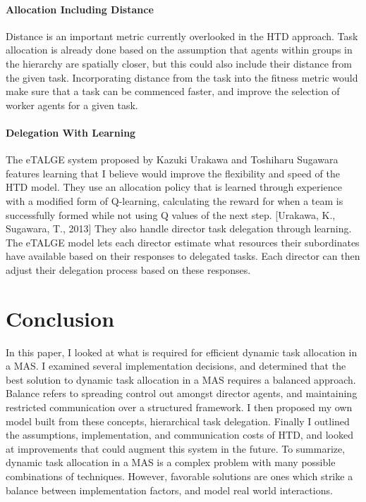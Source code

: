 \documentclass[12pt,letterpaper,onecolumn]{article}
\begin{document}
	\paragraph{Allocation Including Distance}
	Distance is an important metric currently overlooked in the HTD approach. Task allocation is already done based on the assumption that agents within groups in the hierarchy are spatially closer, but this could also include their distance from the given task. Incorporating distance from the task into the fitness metric would make sure that a task can be commenced faster, and improve the selection of worker agents for a given task.
	\paragraph{Delegation With Learning}
	The eTALGE system proposed by Kazuki Urakawa and Toshiharu Sugawara features learning that I believe would improve the flexibility and speed of the HTD model. They use an allocation policy that is learned through experience with a modified form of Q-learning, calculating the reward for when a team is successfully formed while not using Q values of the next step. [Urakawa, K., Sugawara, T., 2013] They also handle director task delegation through learning. The eTALGE model lets each director estimate what resources their subordinates have available based on their responses to delegated tasks. Each director can then adjust their delegation process based on these responses. 
	\section{Conclusion}
	In this paper, I looked at what is required for efficient dynamic task allocation in a MAS. I examined several implementation decisions, and determined that the best solution to dynamic task allocation in a MAS requires a balanced approach. Balance refers to spreading control out amongst director agents, and maintaining restricted communication over a structured framework. I then proposed my own model built from these concepts, hierarchical task delegation. Finally I outlined the assumptions, implementation, and communication costs of HTD, and looked at improvements that could augment this system in the future. To summarize, dynamic task allocation in a MAS is a complex problem with many possible combinations of techniques. However, favorable solutions are ones which strike a balance between implementation factors, and model real world interactions. 
\end{document}
